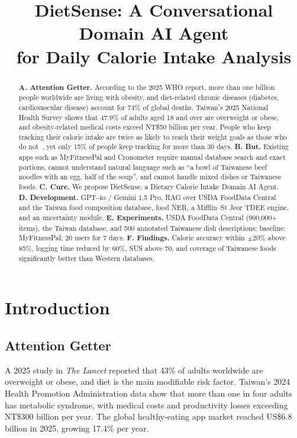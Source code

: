 \documentclass[conference]{IEEEtran}
\begin{document}
\title{DietSense: A Conversational Domain AI Agent\\for Daily Calorie Intake Analysis}

\author{
}

\maketitle

\begin{abstract}
\textbf{A. Attention Getter.} According to the 2025 WHO report, more than one billion people worldwide are living with obesity, and diet-related chronic diseases (diabetes, cardiovascular disease) account for 74\% of global deaths. Taiwan's 2025 National Health Survey shows that 47.9\% of adults aged 18 and over are overweight or obese, and obesity-related medical costs exceed NT\$50 billion per year. People who keep tracking their calorie intake are twice as likely to reach their weight goals as those who do not~\cite{teixeira2025}, yet only 15\% of people keep tracking for more than 30 days.
\textbf{B. But.} Existing apps such as MyFitnessPal and Cronometer require manual database search and exact portions, cannot understand natural language such as ``a bowl of Taiwanese beef noodles with an egg, half of the soup'', and cannot handle mixed dishes or Taiwanese foods.
\textbf{C. Cure.} We propose DietSense, a Dietary Calorie Intake Domain AI Agent.
\textbf{D. Development.} GPT-4o / Gemini 1.5 Pro, RAG over USDA FoodData Central and the Taiwan food composition database, food NER, a Mifflin--St Jeor TDEE engine, and an uncertainty module.
\textbf{E. Experiments.} USDA FoodData Central (900{,}000+ items), the Taiwan database, and 500 annotated Taiwanese dish descriptions; baseline: MyFitnessPal; 20 users for 7 days.
\textbf{F. Findings.} Calorie accuracy within $\pm$20\% above 85\%, logging time reduced by 60\%, SUS above 70, and coverage of Taiwanese foods significantly better than Western databases.
\end{abstract}

\section{Introduction}

\subsection{Attention Getter}
A 2025 study in \emph{The Lancet} reported that 43\% of adults worldwide are overweight or obese, and diet is the main modifiable risk factor. Taiwan's 2024 Health Promotion Administration data show that more than one in four adults has metabolic syndrome, with medical costs and productivity losses exceeding NT\$300 billion per year. The global healthy-eating app market reached US\$6.8 billion in 2025, growing 17.4\% per year.
\end{document}
